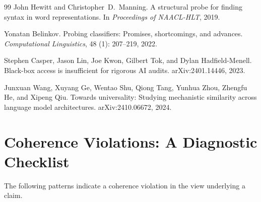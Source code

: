\documentclass{article}
\begin{document}
\begin{thebibliography}{99}
John Hewitt and Christopher~D.\ Manning.
\newblock A structural probe for finding syntax in word representations.
\newblock In \emph{Proceedings of NAACL-HLT}, 2019.

Yonatan Belinkov.
\newblock Probing classifiers: Promises, shortcomings, and advances.
\newblock \emph{Computational Linguistics}, 48 (1): 207--219, 2022.

Stephen Casper, Jason Lin, Joe Kwon, Gilbert Tok, and Dylan Hadfield-Menell.
\newblock Black-box access is insufficient for rigorous {AI} audits.
\newblock arXiv:2401.14446, 2023.

Junxuan Wang, Xuyang Ge, Wentao Shu, Qiong Tang, Yunhua Zhou, Zhengfu He, and
  Xipeng Qiu.
\newblock Towards universality: Studying mechanistic similarity across language
  model architectures.
\newblock arXiv:2410.06672, 2024.

\end{thebibliography}

\newpage
\appendix
\section{Coherence Violations: A Diagnostic Checklist}\label{app:checklist}

The following patterns indicate a coherence violation in the view
underlying a claim.
\end{document}
